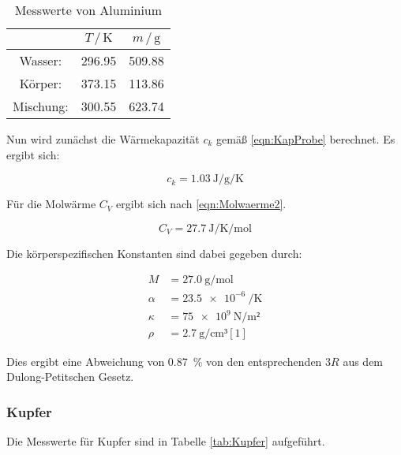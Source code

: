 \begin{table}
\centering
\caption{Messwerte von Aluminium}
\label{tab:Aluminium}
\begin{tabular}{c c c}
\toprule
$ $ & $T \,/\, \si{\kelvin}$& $m \,/\, \si{\gram}$\\
\midrule
  Wasser: & 296.95 & 509.88\\
  Körper: & 373.15 & 113.86\\
Mischung: & 300.55 & 623.74\\
\bottomrule
\end{tabular}
\end{table}

Nun wird zunächst die Wärmekapazität $c_k$ gemäß \ref{eqn:KapProbe} berechnet. 
Es ergibt sich:

\begin{equation*}
c_k = \SI{1.03}{\joule\per\gram\per\kelvin}
\end{equation*}

Für die Molwärme $C_V$ ergibt sich nach \ref{eqn:Molwaerme2}.

\begin{equation*}
C_V = \SI{27.7}{\joule\per\kelvin\per\mol}
\end{equation*}

Die körperspezifischen Konstanten sind dabei gegeben durch: 

\begin{align*}
M &= \SI{27.0}{\gram\per\mol}\\
\alpha &= \SI{23.5e-6}{\per\kelvin}\\
\kappa &= \SI{75e9}{\newton\per\m²}\\
\rho &= \SI{2.7}{\gram\per\centi\meter³} [1]
\end{align*}

Dies ergibt eine Abweichung von \SI{0.87}{\percent} von den entsprechenden $3R$ aus 
dem Dulong-Petitschen Gesetz. 

\subsubsection{Kupfer}

Die Messwerte für Kupfer sind in Tabelle \ref{tab:Kupfer} aufgeführt.

